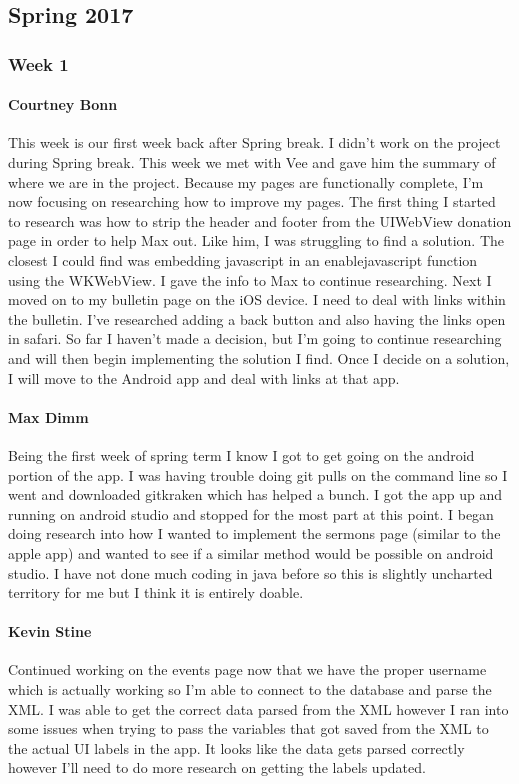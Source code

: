 	\subsection{Spring 2017}
	
		\subsubsection{Week 1}
		
			\paragraph{Courtney Bonn}
			This week is our first week back after Spring break. I didn't work on the project during Spring break. This week we met with Vee and gave him the summary of where we are in the project. Because my pages are functionally complete, I'm now focusing on researching how to improve my pages. The first thing I started to research was how to strip the header and footer from the UIWebView donation page in order to help Max out. Like him, I was struggling to find a solution. The closest I could find was embedding javascript in an enablejavascript function using the WKWebView. I gave the info to Max to continue researching. Next I moved on to my bulletin page on the iOS device. I need to deal with links within the bulletin. I've researched adding a back button and also having the links open in safari. So far I haven't made a decision, but I'm going to continue researching and will then begin implementing the solution I find. Once I decide on a solution, I will move to the Android app and deal with links at that app.

			\paragraph{Max Dimm}
			Being the first week of spring term I know I got to get going on the android portion of the app. I was having trouble doing git pulls on the command line so I went and downloaded gitkraken which has helped a bunch. I got the app up and running on android studio and stopped for the most part at this point. I began doing research into how I wanted to implement the sermons page (similar to the apple app) and wanted to see if a similar method would be possible on android studio. I have not done much coding in java before so this is slightly uncharted territory for me but I think it is entirely doable.
			
			\paragraph{Kevin Stine}
			Continued working on the events page now that we have the proper username which is actually working so I'm able to connect to the database and parse the XML. I was able to get the correct data parsed from the XML however I ran into some issues when trying to pass the variables that got saved from the XML to the actual UI labels in the app. It looks like the data gets parsed correctly however I'll need to do more research on getting the labels updated.
			
